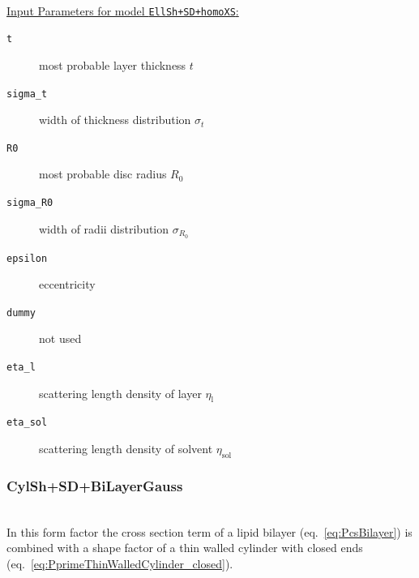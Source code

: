 \hspace{1pt}\\
\uline{Input Parameters for model \texttt{EllSh+SD+homoXS}:}\\
\begin{description}
\item[\texttt{t}] most probable layer thickness $t$
\item[\texttt{sigma\_t}] width of thickness distribution $\sigma_t$
\item[\texttt{R0}] most probable disc radius $R_0$
\item[\texttt{sigma\_R0}] width of radii distribution $\sigma_{R_0}$
\item[\texttt{epsilon}] eccentricity
\item[\texttt{dummy}] not used
\item[\texttt{eta\_l}] scattering length density of layer $\eta_\mathrm{l}$
\item[\texttt{eta\_sol}] scattering length density of solvent $\eta_\mathrm{sol}$
\end{description}


\vspace{5mm}

\noindent
\subsubsection{CylSh+SD+BiLayerGauss} ~\\

\noindent
In this form factor the cross section term of a lipid bilayer (eq.\ \ref{eq:PcsBilayer}) is combined with a shape factor of a thin walled cylinder with closed ends (eq.\ \ref{eq:PprimeThinWalledCylinder_closed}).

\vspace{5mm}

